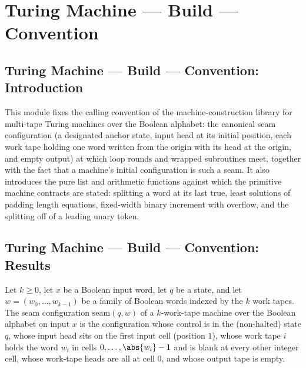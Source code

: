 \section{Turing Machine --- Build --- Convention}
\subsection*{Turing Machine --- Build --- Convention: Introduction}

This module fixes the calling convention of the machine-construction library for
multi-tape Turing machines over the Boolean alphabet: the canonical seam configuration
(a designated anchor state, input head at its initial position, each work tape holding one
word written from the origin with its head at the origin, and empty output) at which loop
rounds and wrapped subroutines meet, together with the fact that a machine's initial
configuration is such a seam. It also introduces the pure list and arithmetic functions
against which the primitive machine contracts are stated: splitting a word at its last
$\mathrm{true}$, least solutions of padding length equations, fixed-width binary
increment with overflow, and the splitting off of a leading unary token.

\subsection*{Turing Machine --- Build --- Convention: Results}

\begin{definition}
\label{Turing.Cfg.ofWords}
\leanok
{}
Let $k \ge 0$, let $x$ be a Boolean input word, let $q$ be a state, and let
$w = (w_0, \dots, w_{k-1})$ be a family of Boolean words indexed by the $k$ work tapes.
The seam configuration $\mathrm{seam}(q, w)$ of a $k$-work-tape machine over the
Boolean alphabet on input $x$ is the configuration whose control is in the (non-halted)
state $q$, whose input head sits on the first input cell (position $1$), whose work tape
$i$ holds the word $w_i$ in cells $0, \dots, \abs{w_i} - 1$ and is blank at every other
integer cell, whose work-tape heads are all at cell $0$, and whose output tape is empty.
\end{definition}


